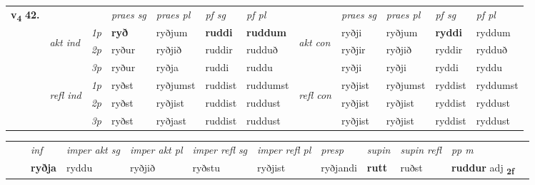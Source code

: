 \begin{tabular}{llllllllllll} \toprule
\multirow{4}{*}{{{\textbf{v{\textsubscript{4}}} \Large{\textbf{42.}}}}}  & &   &  \textit{praes sg}  & \textit{praes pl}  &\textit{ pf sg} & \textit{pf pl} &  &  \textit{praes sg}  & \textit{praes pl}  & \textit{pf sg} & \textit{pf pl } \\*
	\cmidrule{4-7} \cmidrule{9-12}
 & \multirow{3}{*}{\begin{turn}{90}\textit{akt ind}\end{turn}} & {\textit{1p}} & \textbf{ryð} & ryðjum    & \textbf{ruddi} & \textbf{ruddum} & \multirow{3}{*}{\begin{turn}{90}\textit{akt con}\end{turn}} &ryðji & ryðjum & \textbf{ryddi} & ryddum\\*
& &  {\textit{2p}} &  ryður  & ryðjið   & ruddir & rudduð & & ryðjir & ryðjið & ryddir & rydduð \\*
& &  {\textit{3p}} & ryður & ryðja   & ruddi & ruddu & & ryðji & ryðji& ryddi & ryddu  \\*
\cmidrule{4-7} \cmidrule{9-12}
 &\multirow{3}{*}{\begin{turn}{90}\textit{refl ind}\end{turn}} & {\textit{1p}} & ryðst & ryðjumst    & ruddist & ruddumst & \multirow{3}{*}{\begin{turn}{90}\textit{refl con}\end{turn}}  &ryðjist & ryðjumst & ryddist & ryddumst\\*
 &&  {\textit{2p}} &  ryðst  & ryðjist   & ruddist & ruddust & &ryðjist & ryðjist & ryddist & ryddust \\*
& &  {\textit{3p}} & ryðst & ryðjast   & ruddist & ruddust & & ryðjist & ryðjist& ryddist & ryddust  \\*
\cmidrule{4-7} \cmidrule{9-12}
\end{tabular}


\begin{tabular}{llllllllllll}
 & & \textit{inf} & \textit{imper akt sg} & \textit{imper akt pl} & \textit{imper refl sg} & \textit{imper refl pl} & \textit{presp} & \textit{supin} & \textit{supin refl} & \textit{pp m}     \\*
  & & \textbf{ryðja} & ryddu  & ryðjið & ryðstu & ryðjist & ryðjandi &  \textbf{rutt} & ruðst & \textbf{ruddur} adj \textbf{\textsubscript{2f}} \\*
\cmidrule{1-12}
\end{tabular}



